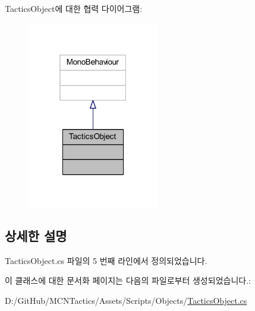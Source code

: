 Tactics\+Object에 대한 협력 다이어그램\+:\nopagebreak
\begin{figure}[H]
\begin{center}
\leavevmode
\includegraphics[width=163pt]{class_tactics_object__coll__graph}
\end{center}
\end{figure}


\subsection{상세한 설명}


Tactics\+Object.\+cs 파일의 5 번째 라인에서 정의되었습니다.



이 클래스에 대한 문서화 페이지는 다음의 파일로부터 생성되었습니다.\+:\begin{DoxyCompactItemize}
\item 
D\+:/\+Git\+Hub/\+M\+C\+N\+Tactics/\+Assets/\+Scripts/\+Objects/\hyperlink{_tactics_object_8cs}{Tactics\+Object.\+cs}\end{DoxyCompactItemize}
